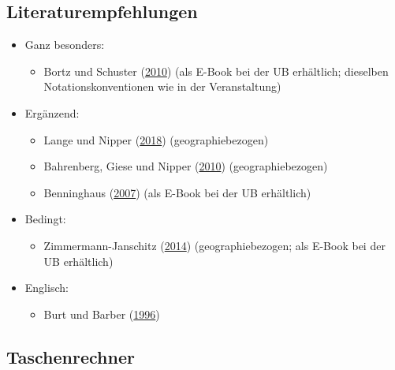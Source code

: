 \documentclass[
  11pt,
  ngerman,
  a4paper,
]{report}
\providecommand{\tightlist}{%
  \setlength{\itemsep}{0pt}\setlength{\parskip}{0pt}}
\begin{document}
\hypertarget{literaturempfehlungen}{%
\subsection*{Literaturempfehlungen}\label{literaturempfehlungen}}

\begin{itemize}
\tightlist
\item
  Ganz besonders:

  \begin{itemize}
  \tightlist
  \item
    Bortz und Schuster (\protect\hyperlink{ref-bortz}{2010}) (als E-Book bei der UB erhältlich; dieselben Notationskonventionen wie in der Veranstaltung)
  \end{itemize}
\item
  Ergänzend:

  \begin{itemize}
  \tightlist
  \item
    Lange und Nipper (\protect\hyperlink{ref-delange}{2018}) (geographiebezogen)
  \item
    Bahrenberg, Giese und Nipper (\protect\hyperlink{ref-bahrenberg}{2010}) (geographiebezogen)
  \item
    Benninghaus (\protect\hyperlink{ref-benninghaus}{2007}) (als E-Book bei der UB erhältlich)
  \end{itemize}
\item
  Bedingt:

  \begin{itemize}
  \tightlist
  \item
    Zimmermann-Janschitz (\protect\hyperlink{ref-zimmermann-janschitz2014a}{2014}) (geographiebezogen; als E-Book bei der UB erhältlich)
  \end{itemize}
\item
  Englisch:

  \begin{itemize}
  \tightlist
  \item
    Burt und Barber (\protect\hyperlink{ref-burt}{1996})
  \end{itemize}
\end{itemize}

\hypertarget{taschenrechner}{%
\subsection*{Taschenrechner}\label{taschenrechner}}
\end{document}

